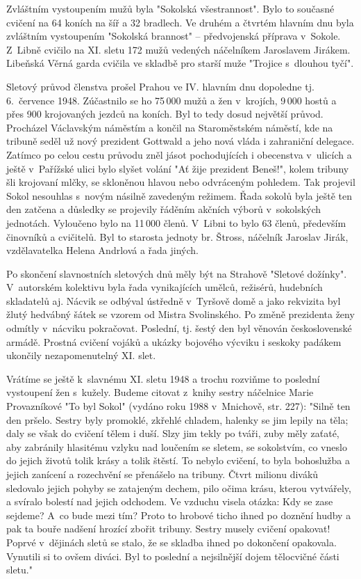 \documentclass[a5paper, 11pt, twoside]{article}
\begin{document}
Zvláštním vystoupením mužů byla "Sokolská všestrannost". Bylo to
současné cvičení na 64 koních na šíř a 32 bradlech. Ve druhém a čtvrtém
hlavním dnu byla zvláštním vystoupením "Sokolská brannost" --
předvojenská příprava v~Sokole. Z~Libně cvičilo na XI. sletu 172 mužů
vedených náčelníkem Jaroslavem Jirákem. Libeňská Věrná garda cvičila ve
skladbě pro starší muže "Trojice s~dlouhou tyčí".

Sletový průvod členstva prošel Prahou ve IV. hlavním dnu dopoledne tj.
6.~července 1948. Zúčastnilo se ho 75\,000 mužů a žen v~krojích, 9\,000
hostů a přes 900 krojovaných jezdců na koních. Byl to tedy dosud
největší průvod. Procházel Václavským náměstím a končil na Staroměstském
náměstí, kde na tribuně seděl už nový prezident Gottwald a jeho nová
vláda i zahraniční delegace. Zatímco po celou cestu průvodu zněl jásot
pochodujících i obecenstva v~ulicích a ještě v~Pařížské ulici bylo
slyšet volání "Ať žije prezident Beneš!", kolem tribuny šli krojovaní
mlčky, se skloněnou hlavou nebo odvráceným pohledem. Tak projevil Sokol
nesouhlas s~novým násilně zavedeným režimem. Řada sokolů byla ještě ten
den zatčena a důsledky se projevily řáděním akčních výborů v~sokolských
jednotách. Vyloučeno bylo na 11\,000 členů. V~Libni to bylo 63 členů,
především činovníků a cvičitelů. Byl to starosta jednoty br. Štross,
náčelník Jaroslav Jirák, vzdělavatelka Helena Andrlová a řada jiných.

Po skončení slavnostních sletových dnů měly být na Strahově "Sletové
dožínky". V~autorském kolektivu byla řada vynikajících umělců,
režisérů, hudebních skladatelů aj. Nácvik se odbýval ústředně v~Tyršově
domě a jako rekvizita byl žlutý hedvábný šátek se vzorem od Mistra
Svolinského. Po změně prezidenta ženy odmítly v~nácviku pokračovat.
Poslední, tj. šestý den byl věnován československé armádě. Prostná
cvičení vojáků a ukázky bojového výcviku i seskoky padákem ukončily
nezapomenutelný XI. slet.

Vrátíme se ještě k~slavnému XI. sletu 1948 a trochu rozviňme to poslední
vystoupení žen s~kužely. Budeme citovat z~knihy sestry náčelnice Marie
Provazníkové "To byl Sokol" (vydáno roku 1988 v~Mnichově, str. 227):
"Silně ten den pršelo. Sestry byly promoklé, zkřehlé chladem, halenky se
jim lepily na těla; daly se však do cvičení tělem i duší. Slzy jim tekly
po tváři, zuby měly zaťaté, aby zabránily hlasitému vzlyku nad loučením
se sletem, se sokolstvím, co vneslo do jejich životů tolik krásy a tolik
štěstí. To nebylo cvičení, to byla bohoslužba a jejich zanícení a
rozechvění se přenášelo na tribuny. Čtvrt milionu diváků sledovalo
jejich pohyby se zatajeným dechem, pilo očima krásu, kterou vytvářely, a
svíralo bolestí nad jejich odchodem. Ve vzduchu visela otázka: Kdy se
zase sejdeme? A~co bude mezi tím? Proto to hrobové ticho ihned po
doznění hudby a pak ta bouře nadšení hrozící zbořit tribuny. Sestry
musely cvičení opakovat! Poprvé v~dějinách sletů se stalo, že se skladba
ihned po dokončení opakovala. Vynutili si to ovšem diváci. Byl to
poslední a nejsilnější dojem tělocvičné části sletu."
\end{document}
